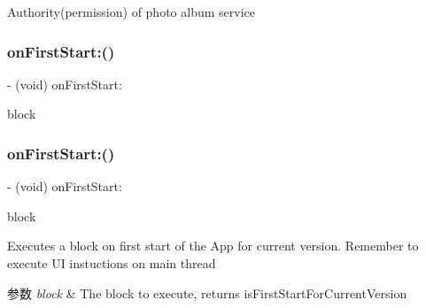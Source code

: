 Authority(permission) of photo album service \mbox{\label{interface_m_a_r_global_manager_aa4630974c2d25f5329ee018b5a082d83}} 
\subsubsection{\texorpdfstring{on\+First\+Start\+:()}{onFirstStart:()}\hspace{0.1cm}{\footnotesize\ttfamily [1/3]}}
{\footnotesize\ttfamily -\/ (void) on\+First\+Start\+: \begin{DoxyParamCaption}\item[{(void($^\wedge$)(B\+O\+OL))}]{block }\end{DoxyParamCaption}\hspace{0.3cm}{\ttfamily [implementation]}}

\mbox{\label{interface_m_a_r_global_manager_a94914844e4bcead6ec3e96b71d6f3473}} 
\subsubsection{\texorpdfstring{on\+First\+Start\+:()}{onFirstStart:()}\hspace{0.1cm}{\footnotesize\ttfamily [2/3]}}
{\footnotesize\ttfamily -\/ (void) on\+First\+Start\+: \begin{DoxyParamCaption}\item[{(void($^\wedge$)(B\+O\+OL \hyperlink{interface_m_a_r_global_manager_ab871ef83135ce7e7f412fdebfae76c0d}{is\+First\+Start}))}]{block }\end{DoxyParamCaption}}

Executes a block on first start of the App for current version. Remember to execute UI instuctions on main thread


\begin{DoxyParams}{参数}
{\em block} & The block to execute, returns is\+First\+Start\+For\+Current\+Version \\
\hline
\end{DoxyParams}
\mbox{\label{interface_m_a_r_global_manager_a94914844e4bcead6ec3e96b71d6f3473}} 
